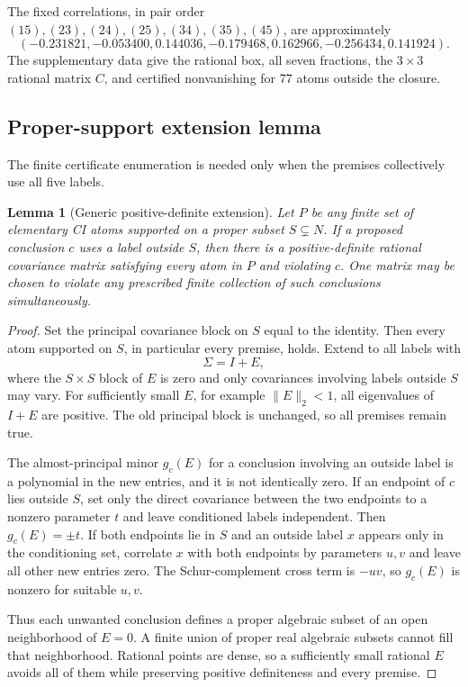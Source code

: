 \documentclass[10pt]{article}
\newtheorem{lemma}[theorem]{Lemma}
\theoremstyle{definition}
\begin{document}
The fixed correlations, in pair order $(15),(23),(24),(25),(34),(35),(45)$, are approximately
\[
 (-0.231821,-0.053400,0.144036,-0.179468,0.162966,-0.256434,0.141924).
\]
The supplementary data give the rational box, all seven fractions, the $3\times3$ rational matrix $C$, and certified nonvanishing for 77 atoms outside the closure.

\FloatBarrier
\subsection{Proper-support extension lemma}

The finite certificate enumeration is needed only when the premises collectively use all five labels.

\begin{lemma}[Generic positive-definite extension]\label{lem:extension}
Let $P$ be any finite set of elementary CI atoms supported on a proper subset $S\subsetneq N$.  If a proposed conclusion $c$ uses a label outside $S$, then there is a positive-definite rational covariance matrix satisfying every atom in $P$ and violating $c$.  One matrix may be chosen to violate any prescribed finite collection of such conclusions simultaneously.
\end{lemma}

\begin{proof}
Set the principal covariance block on $S$ equal to the identity.  Then every atom supported on $S$, in particular every premise, holds.  Extend to all labels with
\[
 \Sigma=I+E,
\]
where the $S\times S$ block of $E$ is zero and only covariances involving labels outside $S$ may vary.  For sufficiently small $E$, for example $\|E\|_2<1$, all eigenvalues of $I+E$ are positive.  The old principal block is unchanged, so all premises remain true.

The almost-principal minor $g_c(E)$ for a conclusion involving an outside label is a polynomial in the new entries, and it is not identically zero.  If an endpoint of $c$ lies outside $S$, set only the direct covariance between the two endpoints to a nonzero parameter $t$ and leave conditioned labels independent.  Then $g_c(E)=\pm t$.  If both endpoints lie in $S$ and an outside label $x$ appears only in the conditioning set, correlate $x$ with both endpoints by parameters $u,v$ and leave all other new entries zero.  The Schur-complement cross term is $-uv$, so $g_c(E)$ is nonzero for suitable $u,v$.

Thus each unwanted conclusion defines a proper algebraic subset of an open neighborhood of $E=0$.  A finite union of proper real algebraic subsets cannot fill that neighborhood.  Rational points are dense, so a sufficiently small rational $E$ avoids all of them while preserving positive definiteness and every premise.
\end{proof}
\end{document}
